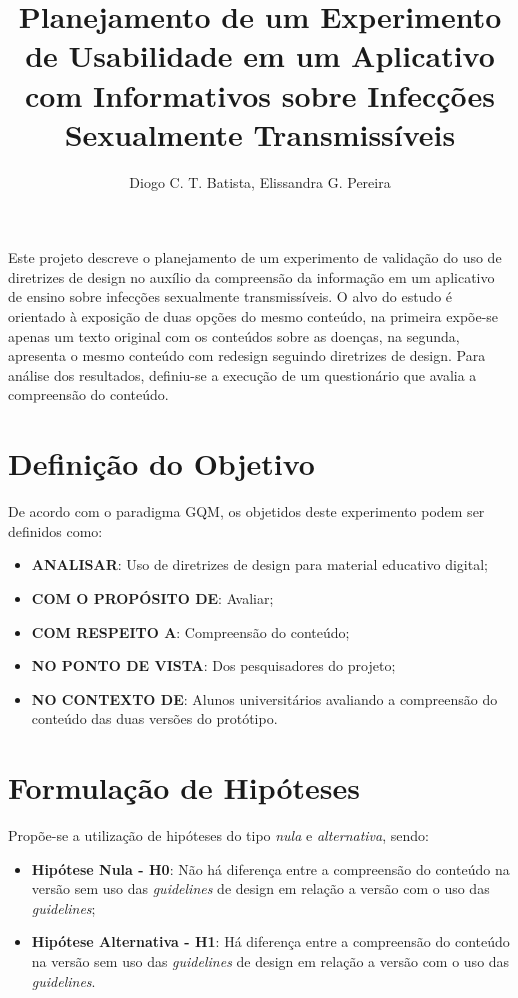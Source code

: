 \documentclass[12pt]{article}
\title{Planejamento de um Experimento de Usabilidade em um Aplicativo com Informativos sobre Infecções Sexualmente Transmissíveis}
\author{Diogo C. T. Batista\inst{1}, Elissandra G. Pereira\inst{1}}
\begin{document}
\maketitle

\begin{resumo}
	Este projeto descreve o planejamento de um experimento de validação do uso de diretrizes de design no auxílio da compreensão da informação em um aplicativo de ensino sobre infecções sexualmente transmissíveis. O alvo do estudo é orientado à exposição de duas opções do mesmo conteúdo, na primeira expõe-se apenas um texto original com os conteúdos sobre as doenças, na segunda, apresenta o mesmo conteúdo com redesign seguindo diretrizes de design. Para análise dos resultados, definiu-se a execução de um questionário que avalia a compreensão do conteúdo.
\end{resumo}

\section{Definição do Objetivo}

De acordo com o paradigma GQM, os objetidos deste experimento podem ser definidos como:

\begin{itemize}
	\item \textbf{ANALISAR}: Uso de diretrizes de design para material educativo digital;
	\item \textbf{COM O PROPÓSITO DE}: Avaliar;
	\item \textbf{COM RESPEITO A}: Compreensão do conteúdo;
	\item \textbf{NO PONTO DE VISTA}: Dos pesquisadores do projeto;
	\item \textbf{NO CONTEXTO DE}: Alunos universitários avaliando a compreensão do conteúdo das duas versões do protótipo.
\end{itemize}

\section{Formulação de Hipóteses}

Propõe-se a utilização de hipóteses do tipo \textit{nula} e \textit{alternativa}, sendo:

\begin{itemize}
	\item \textbf{Hipótese Nula - H0}: Não há diferença entre a compreensão do conteúdo na versão sem uso das \textit{guidelines} de design em relação a versão com o uso das \textit{guidelines};
	\item \textbf{Hipótese Alternativa - H1}: Há diferença entre a compreensão do conteúdo na versão sem uso das \textit{guidelines} de design em relação a versão com o uso das \textit{guidelines}.
\end{itemize}
\end{document}
